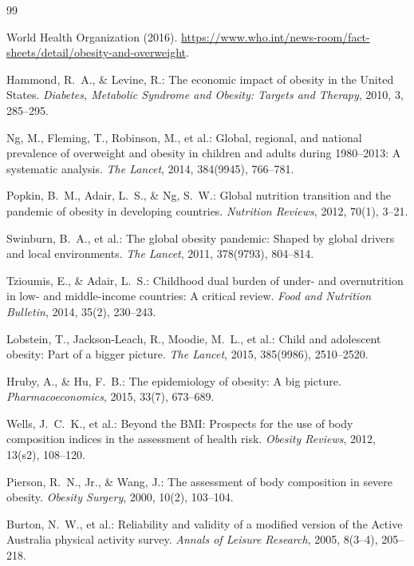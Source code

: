 \documentclass[12pt, a4paper]{article}
\begin{document}
\begin{thebibliography}{99}

World Health Organization (2016). \url{https://www.who.int/news-room/fact-sheets/detail/obesity-and-overweight}.

Hammond, R.~A., \& Levine, R.: The economic impact of obesity in the United States.
\textit{Diabetes, Metabolic Syndrome and Obesity: Targets and Therapy}, 2010, 3, 285--295.

Ng, M., Fleming, T., Robinson, M., et al.: Global, regional, and national prevalence of
overweight and obesity in children and adults during 1980--2013: A systematic analysis.
\textit{The Lancet}, 2014, 384(9945), 766--781.

Popkin, B.~M., Adair, L.~S., \& Ng, S.~W.: Global nutrition transition and the pandemic
of obesity in developing countries. \textit{Nutrition Reviews}, 2012, 70(1), 3--21.

Swinburn, B.~A., et al.: The global obesity pandemic: Shaped by global drivers and local
environments. \textit{The Lancet}, 2011, 378(9793), 804--814.

Tzioumis, E., \& Adair, L.~S.: Childhood dual burden of under- and overnutrition in
low- and middle-income countries: A critical review. \textit{Food and Nutrition Bulletin},
2014, 35(2), 230--243.

Lobstein, T., Jackson-Leach, R., Moodie, M.~L., et al.: Child and adolescent obesity:
Part of a bigger picture. \textit{The Lancet}, 2015, 385(9986), 2510--2520.

Hruby, A., \& Hu, F.~B.: The epidemiology of obesity: A big picture.
\textit{Pharmacoeconomics}, 2015, 33(7), 673--689.

Wells, J.~C.~K., et al.: Beyond the BMI: Prospects for the use of body composition
indices in the assessment of health risk. \textit{Obesity Reviews}, 2012, 13(s2),
108--120.

Pierson, R.~N., Jr., \& Wang, J.: The assessment of body composition in severe obesity.
\textit{Obesity Surgery}, 2000, 10(2), 103--104.

Burton, N.~W., et al.: Reliability and validity of a modified version of the Active
Australia physical activity survey. \textit{Annals of Leisure Research}, 2005, 8(3--4),
205--218.


\end{thebibliography}
\end{document}
